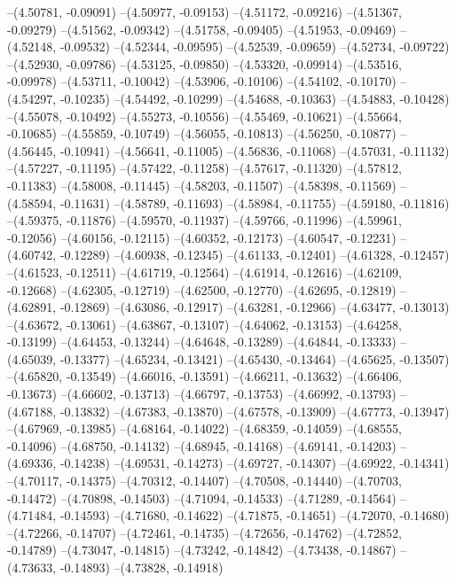 --(4.50781, -0.09091)
--(4.50977, -0.09153)
--(4.51172, -0.09216)
--(4.51367, -0.09279)
--(4.51562, -0.09342)
--(4.51758, -0.09405)
--(4.51953, -0.09469)
--(4.52148, -0.09532)
--(4.52344, -0.09595)
--(4.52539, -0.09659)
--(4.52734, -0.09722)
--(4.52930, -0.09786)
--(4.53125, -0.09850)
--(4.53320, -0.09914)
--(4.53516, -0.09978)
--(4.53711, -0.10042)
--(4.53906, -0.10106)
--(4.54102, -0.10170)
--(4.54297, -0.10235)
--(4.54492, -0.10299)
--(4.54688, -0.10363)
--(4.54883, -0.10428)
--(4.55078, -0.10492)
--(4.55273, -0.10556)
--(4.55469, -0.10621)
--(4.55664, -0.10685)
--(4.55859, -0.10749)
--(4.56055, -0.10813)
--(4.56250, -0.10877)
--(4.56445, -0.10941)
--(4.56641, -0.11005)
--(4.56836, -0.11068)
--(4.57031, -0.11132)
--(4.57227, -0.11195)
--(4.57422, -0.11258)
--(4.57617, -0.11320)
--(4.57812, -0.11383)
--(4.58008, -0.11445)
--(4.58203, -0.11507)
--(4.58398, -0.11569)
--(4.58594, -0.11631)
--(4.58789, -0.11693)
--(4.58984, -0.11755)
--(4.59180, -0.11816)
--(4.59375, -0.11876)
--(4.59570, -0.11937)
--(4.59766, -0.11996)
--(4.59961, -0.12056)
--(4.60156, -0.12115)
--(4.60352, -0.12173)
--(4.60547, -0.12231)
--(4.60742, -0.12289)
--(4.60938, -0.12345)
--(4.61133, -0.12401)
--(4.61328, -0.12457)
--(4.61523, -0.12511)
--(4.61719, -0.12564)
--(4.61914, -0.12616)
--(4.62109, -0.12668)
--(4.62305, -0.12719)
--(4.62500, -0.12770)
--(4.62695, -0.12819)
--(4.62891, -0.12869)
--(4.63086, -0.12917)
--(4.63281, -0.12966)
--(4.63477, -0.13013)
--(4.63672, -0.13061)
--(4.63867, -0.13107)
--(4.64062, -0.13153)
--(4.64258, -0.13199)
--(4.64453, -0.13244)
--(4.64648, -0.13289)
--(4.64844, -0.13333)
--(4.65039, -0.13377)
--(4.65234, -0.13421)
--(4.65430, -0.13464)
--(4.65625, -0.13507)
--(4.65820, -0.13549)
--(4.66016, -0.13591)
--(4.66211, -0.13632)
--(4.66406, -0.13673)
--(4.66602, -0.13713)
--(4.66797, -0.13753)
--(4.66992, -0.13793)
--(4.67188, -0.13832)
--(4.67383, -0.13870)
--(4.67578, -0.13909)
--(4.67773, -0.13947)
--(4.67969, -0.13985)
--(4.68164, -0.14022)
--(4.68359, -0.14059)
--(4.68555, -0.14096)
--(4.68750, -0.14132)
--(4.68945, -0.14168)
--(4.69141, -0.14203)
--(4.69336, -0.14238)
--(4.69531, -0.14273)
--(4.69727, -0.14307)
--(4.69922, -0.14341)
--(4.70117, -0.14375)
--(4.70312, -0.14407)
--(4.70508, -0.14440)
--(4.70703, -0.14472)
--(4.70898, -0.14503)
--(4.71094, -0.14533)
--(4.71289, -0.14564)
--(4.71484, -0.14593)
--(4.71680, -0.14622)
--(4.71875, -0.14651)
--(4.72070, -0.14680)
--(4.72266, -0.14707)
--(4.72461, -0.14735)
--(4.72656, -0.14762)
--(4.72852, -0.14789)
--(4.73047, -0.14815)
--(4.73242, -0.14842)
--(4.73438, -0.14867)
--(4.73633, -0.14893)
--(4.73828, -0.14918)

